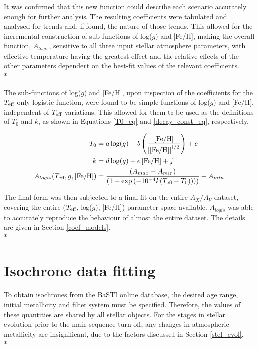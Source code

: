 \documentclass[12pt, a4paper]{report}
\begin{document}
It was confirmed that this new function could describe each scenario accurately enough for further analysis. The resulting coefficients were tabulated and analysed for trends and, if found, the nature of those trends. This allowed for the incremental construction of sub-functions of log($g$) and [Fe/H], making the overall function, $A_{logis}$, sensitive to all three input stellar atmosphere parameters, with effective temperature having the greatest effect and the relative effects of the other parameters dependent on the best-fit values of the relevant coefficients.\\*

The sub-functions of log($g$) and [Fe/H], upon inspection of the coefficients for the $T_{\textnormal{eff}}$-only logistic function, were found to be simple functions of log($g$) and [Fe/H], independent of $T_{\textnormal{eff}}$ variations. This allowed for them to be used as the definitions of $T_{0}$ and $k$, as shown in Equations \ref{T0_eq} and \ref{decay_const_eq}, respectively.

\begin{align}
T_{\textnormal{0}} &= a\log(g) + b\left(\frac{\left[\textnormal{Fe/H}\right]}{\left|\left[\textnormal{Fe/H}\right]\right|^{1/2}}\right) + c \label{T0_eq}\\
k &= d\log(g) + e\left[\textnormal{Fe/H}\right] + f \label{decay_const_eq}\\
A_{logis}(T_{\textnormal{eff}},g,\left[\textnormal{Fe/H}\right]) &= \frac{(A_{max}-A_{min})}{( 1 + \exp{(-10^{-4} k(T_{\textnormal{eff}}-T_{\textnormal{0}})) ) )}} + A_{min} \label{A_logis_UV}
\end{align}

The final form was then subjected to a final fit on the entire $A_{X}/A_{V}$ dataset, covering the entire ($T_{\textnormal{eff}}$,  log($g$), [Fe/H]) parameter space available. $A_{logis}$ was able to accurately reproduce the behaviour of almost the entire dataset. The details are given in Section \ref{coef_models}.\\*

\section{Isochrone data fitting}
To obtain isochrones from the BaSTI online database, the desired age range, initial metallicity and filter system must be specified. Therefore, the values of these quantities are shared by all stellar objects. For the stages in stellar evolution prior to the main-sequence turn-off, any changes in atmospheric metallicity are insignificant, due to the factors discussed in Section \ref{stel_evol}.\\*
\end{document}
